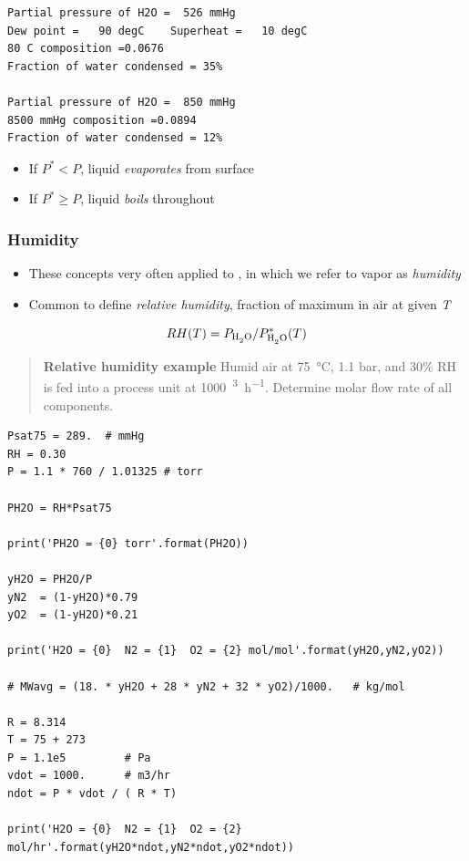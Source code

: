\documentclass[11pt]{article}
\begin{document}
\begin{verbatim}
Partial pressure of H2O =  526 mmHg
Dew point =   90 degC    Superheat =   10 degC
80 C composition =0.0676
Fraction of water condensed = 35%

Partial pressure of H2O =  850 mmHg
8500 mmHg composition =0.0894
Fraction of water condensed = 12%

\end{verbatim}

\begin{itemize}
\item If \(P^{*} < P\), liquid \emph{evaporates} from surface
\item If \(P^{*} \ge P\), liquid \emph{boils} throughout
\end{itemize}

\subsubsection{Humidity}
\label{sec-8-3-2}
\begin{itemize}
\item These concepts very often applied to , in which we refer to  vapor as \emph{humidity}
\item Common to define \emph{relative humidity}, fraction of maximum  in air at given \emph{T}
\end{itemize}

\[ RH(T) = P_{\ce{H2O}}/P^{*}_{\ce{H2O}}(T) \]

\begin{quote}
\hline
\textbf{Relative humidity example} Humid air at \SI{75}{\celsius}, 1.1 bar, and 30\% RH is fed into a process unit at \SI{1000}{\meters\cubed\per\hour}.  Determine molar flow rate of all components.
\hline
\end{quote}
\begin{verbatim}
Psat75 = 289.  # mmHg
RH = 0.30
P = 1.1 * 760 / 1.01325 # torr

PH2O = RH*Psat75

print('PH2O = {0} torr'.format(PH2O))

yH2O = PH2O/P
yN2  = (1-yH2O)*0.79
yO2  = (1-yH2O)*0.21

print('H2O = {0}  N2 = {1}  O2 = {2} mol/mol'.format(yH2O,yN2,yO2))

# MWavg = (18. * yH2O + 28 * yN2 + 32 * yO2)/1000.   # kg/mol

R = 8.314
T = 75 + 273
P = 1.1e5         # Pa
vdot = 1000.      # m3/hr
ndot = P * vdot / ( R * T)

print('H2O = {0}  N2 = {1}  O2 = {2} mol/hr'.format(yH2O*ndot,yN2*ndot,yO2*ndot))
\end{verbatim}
\end{document}
